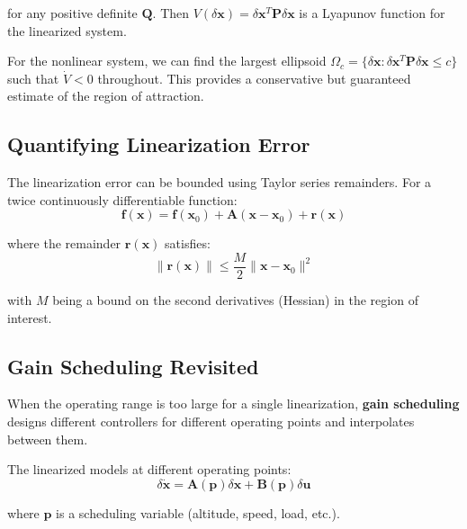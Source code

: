 for any positive definite $\mathbf{Q}$. Then $V(\delta\mathbf{x}) = \delta\mathbf{x}^T\mathbf{P}\delta\mathbf{x}$ is a Lyapunov function for the linearized system.

For the nonlinear system, we can find the largest ellipsoid $\Omega_c = \{\delta\mathbf{x} : \delta\mathbf{x}^T\mathbf{P}\delta\mathbf{x} \leq c\}$ such that $\dot{V} < 0$ throughout. This provides a conservative but guaranteed estimate of the region of attraction.

\subsection{Quantifying Linearization Error}

The linearization error can be bounded using Taylor series remainders. For a twice continuously differentiable function:
\begin{equation}
\mathbf{f}(\mathbf{x}) = \mathbf{f}(\mathbf{x}_0) + \mathbf{A}(\mathbf{x} - \mathbf{x}_0) + \mathbf{r}(\mathbf{x})
\end{equation}

where the remainder $\mathbf{r}(\mathbf{x})$ satisfies:
\begin{equation}
\|\mathbf{r}(\mathbf{x})\| \leq \frac{M}{2}\|\mathbf{x} - \mathbf{x}_0\|^2
\end{equation}

with $M$ being a bound on the second derivatives (Hessian) in the region of interest.


\subsection{Gain Scheduling Revisited}

When the operating range is too large for a single linearization, \textbf{gain scheduling} designs different controllers for different operating points and interpolates between them.

The linearized models at different operating points:
\begin{equation}
\delta\dot{\mathbf{x}} = \mathbf{A}(\mathbf{p})\delta\mathbf{x} + \mathbf{B}(\mathbf{p})\delta\mathbf{u}
\end{equation}

where $\mathbf{p}$ is a scheduling variable (altitude, speed, load, etc.).

